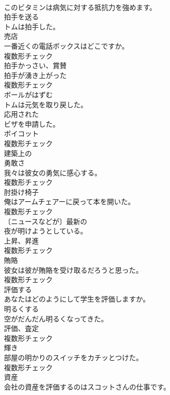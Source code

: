 \documentclass[8pt]{extreport}
\begin{document}
\begin{CJK}{UTF8}{min}
\\	このビタミンは病気に対する抵抗力を強めます。	
\\	[動詞]	拍手を送る	
\\	トムは拍手した。	
\\	[名詞]	売店	
\\	一番近くの電話ボックスはどこですか。	
\\	複数形チェック
\\	[名詞]	拍手かっさい、賞賛	
\\	拍手が湧き上がった	
\\	複数形チェック
\\	[動詞]	ボールがはずむ	
\\	トムは元気を取り戻した。	
\\	[形容詞]	応用された	
\\	ビザを申請した。	
\\	[名詞]	ボイコット	
\\	複数形チェック
\\	[形容詞]	建築上の	
\\	[名詞]	勇敢さ	
\\	我々は彼女の勇気に感心する。	
\\	複数形チェック
\\	[名詞]	肘掛け椅子	
\\	俺はアームチェアーに戻って本を開いた。	
\\	複数形チェック
\\	[形容詞]	〔ニュースなどが〕最新の	
\\	夜が明けようとしている。	
\\	[名詞]	上昇、昇進	
\\	複数形チェック
\\	[名詞]	賄賂	
\\	彼女は彼が賄賂を受け取るだろうと思った。	
\\	複数形チェック
\\	[動詞]	評価する	
\\	あなたはどのようにして学生を評価しますか。	
\\	[動詞]	明るくする	
\\	空がだんだん明るくなってきた。	
\\	[名詞]	評価、査定	
\\	複数形チェック
\\	[名詞]	輝き	
\\	部屋の明かりのスイッチをカチッとつけた。	
\\	複数形チェック
\\	[名詞]	資産	
\\	会社の資産を評価するのはスコットさんの仕事です。	

\end{CJK}
\end{document}
